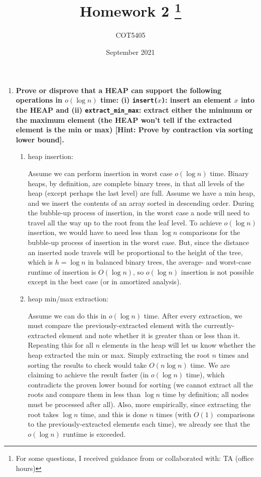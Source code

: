\documentclass[12pt]{article}
\title{Homework 2
    \thanks{For some questions, I received guidance from or collaborated with: TA (office hours)}
}
\author{COT5405}
\date{September 2021}
\begin{document}
\maketitle

\begin{enumerate}
    \item \textbf{Prove or disprove that a HEAP can support the following operations in $o(\log n)$ time: 
    (i) \texttt{insert($x$)}: insert an element $x$ into the HEAP and (ii) \texttt{extract\_min\_max}: extract either 
    the minimum or the maximum element (the HEAP won't tell if the extracted element is the min 
    or max) [Hint: Prove by contraction via sorting lower bound].}

    \begin{enumerate}
        \item heap insertion:
        
        Assume we can perform insertion in worst case $o(\log n)$ time. Binary heaps, by definition, are complete binary trees, 
        in that all levels of the heap (except perhaps the last level) are full. Assume we have a min heap, and we insert 
        the contents of an array sorted in descending order. During the bubble-up process of insertion, in the worst case 
        a node will need to travel all the way up to the root from the leaf level. To achieve $o(\log n)$ insertion, 
        we would have to need less than $\log n$ comparisons for the bubble-up process of insertion in the worst case. But, since the distance 
        an inserted node travels will be proportional to the height of the tree, which is $h = \log n$ in balanced binary 
        trees, the average- and worst-case runtime of insertion is $O(\log n)$, so $o(\log n)$ insertion is not possible 
        except in the best case (or in amortized analysis).

        \item heap min/max extraction:
        
        Assume we can do this in $o(\log n)$ time. After every extraction, we must compare the previously-extracted element 
        with the currently-extracted element and note whether it is greater than or less than it. Repeating this for  
        all $n$ elements in the heap will let us know whether the heap extracted the min or max. Simply extracting 
        the root $n$ times and sorting the results to check would take $O(n\log n)$ time. We are claiming to achieve the result 
        faster (in $o(\log n)$ time), which contradicts the proven lower bound for sorting (we cannot extract all the roots 
        and compare them in less than $\log n$ time by definition; all nodes must be processed after all). Also, more 
        empirically, since extracting the root takes $\log n$ time, and this is done $n$ times (with $O(1)$ comparisons 
        to the previously-extracted elements each time), we already see that the $o(\log n)$ runtime is exceeded.
        

\end{enumerate}
\end{enumerate}
\end{document}
